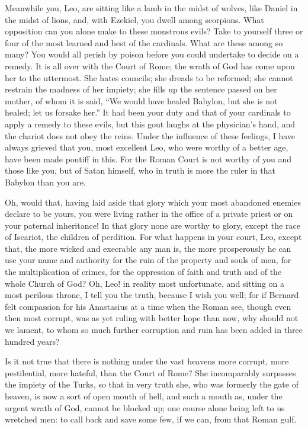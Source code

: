 Meanwhile you, Leo, are sitting like a lamb in the midst of wolves, like
Daniel in the midst of lions, and, with Ezekiel, you dwell among
scorpions. What opposition can you alone make to these monstrous evils?
Take to yourself three or four of the most learned and best of the
cardinals. What are these among so many? You would all perish by poison
before you could undertake to decide on a remedy. It is all over with the
Court of Rome; the wrath of God has come upon her to the uttermost. She
hates councils; she dreads to be reformed; she cannot restrain the madness
of her impiety; she fills up the sentence passed on her mother, of whom it
is said, ``We would have healed Babylon, but she is not healed; let us
forsake her.'' It had been your duty and that of your cardinals to apply a
remedy to these evils, but this gout laughs at the physician's hand, and
the chariot does not obey the reins. Under the influence of these
feelings, I have always grieved that you, most excellent Leo, who were
worthy of a better age, have been made pontiff in this. For the Roman
Court is not worthy of you and those like you, but of Satan himself, who
in truth is more the ruler in that Babylon than you are.

Oh, would that, having laid aside that glory which your most abandoned
enemies declare to be yours, you were living rather in the office of a
private priest or on your paternal inheritance! In that glory none are
worthy to glory, except the race of Iscariot, the children of perdition.
For what happens in your court, Leo, except that, the more wicked and
execrable any man is, the more prosperously he can use your name and
authority for the ruin of the property and souls of men, for the
multiplication of crimes, for the oppression of faith and truth and of the
whole Church of God? Oh, Leo! in reality most unfortunate, and sitting on
a most perilous throne, I tell you the truth, because I wish you well; for
if Bernard felt compassion for his Anastasius at a time when the Roman
see, though even then most corrupt, was as yet ruling with better hope
than now, why should not we lament, to whom so much further corruption and
ruin has been added in three hundred years?

Is it not true that there is nothing under the vast heavens more corrupt,
more pestilential, more hateful, than the Court of Rome? She incomparably
surpasses the impiety of the Turks, so that in very truth she, who was
formerly the gate of heaven, is now a sort of open mouth of hell, and such
a mouth as, under the urgent wrath of God, cannot be blocked up; one
course alone being left to us wretched men: to call back and save some
few, if we can, from that Roman gulf.

